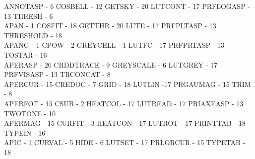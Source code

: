 {\begin{tabbing}
 ANNOTASP - 6                            \>COSBELL - 12                          
   \>GETSKY - 20                             \>
 LUTCONT - 17                            \>PRFLOGASP - 13                        
   \>THRESH - 6                              \\
 APAN - 1                                \>COSFIT - 18                           
   \>GETTHR - 20                             \>
 LUTE - 17                               \>PRFPLTASP - 13                        
   \>THRESHOLD - 18                          \\
 APANG - 1                               \>CPOW - 2                              
   \>GREYCELL - 1                            \>
 LUTFC - 17                              \>PRFPRTASP - 13                        
   \>TOSTAR - 16                             \\
 APERASP - 20                            \>CRDDTRACE - 9                         
   \>GREYSCALE - 6                           \>
 LUTGREY - 17                            \>PRFVISASP - 13                        
   \>TRCONCAT - 8                            \\
 APERCUR - 15                            \>CREDOC - 7                            
   \>GRID - 18                               \>
 LUTLIN -17                              \>PRGAUMAG - 15                         
   \>TRIM - 8                                \\
 APERFOT - 15                            \>CSUB - 2                              
   \>HEATCOL - 17                            \>
 LUTREAD - 17                            \>PRIAXEASP - 13                        
   \>TWOTONE - 10                            \\
 APERMAG - 15                            \>CURFIT - 3                            
   \>HEATCON - 17                            \>
 LUTROT - 17                             \>PRINTTAB - 18                         
   \>TYPEIN - 16                             \\
 APIC - 1                                \>CURVAL - 5                            
   \>HIDE - 6                                \>
 LUTSET - 17                             \>PRLORCUR - 15                         
   \>TYPETAB - 18                            \\
\end{tabbing}

\vspace{-8mm}

}
